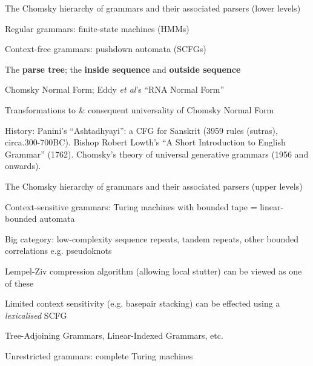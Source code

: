 \documentclass{beamer}
\begin{document}
\begin{frame}{}
\itemb
\item The Chomsky hierarchy of grammars and their associated parsers (lower levels)
 \itemb
 \item Regular grammars: finite-state machines (HMMs)
 \item Context-free grammars: pushdown automata (SCFGs)
  \itemb
  \item The {\bf parse tree}; the {\bf inside sequence} and {\bf outside sequence}
  \item Chomsky Normal Form; Eddy {\em et al}'s ``RNA Normal Form''
  \item Transformations to \& consequent universality of Chomsky Normal Form
  \item History:
Panini's ``Ashtadhyayi'': a CFG for Sanskrit (3959 rules (sutras), circa.300-700BC).
Bishop Robert Lowth's ``A Short Introduction to English Grammar'' (1762).
Chomsky's theory of universal generative grammars (1956 and onwards).
  \iteme
 \iteme
\iteme
\end{frame}
\begin{frame}{}
\itemb
\item The Chomsky hierarchy of grammars and their associated parsers (upper levels)
 \itemb
 \item Context-sensitive grammars: Turing machines with bounded tape = linear-bounded automata
  \itemb
  \item Big category: low-complexity sequence repeats, tandem repeats, other bounded correlations e.g. pseudoknots
  \item Lempel-Ziv compression algorithm (allowing local stutter) can be viewed as one of these
  \item Limited context sensitivity (e.g. basepair stacking) can be effected using a {\em lexicalised} SCFG
  \item Tree-Adjoining Grammars, Linear-Indexed Grammars, etc.
  \iteme
 \item Unrestricted grammars: complete Turing machines
 \iteme
\iteme
\end{frame}
\end{document}
